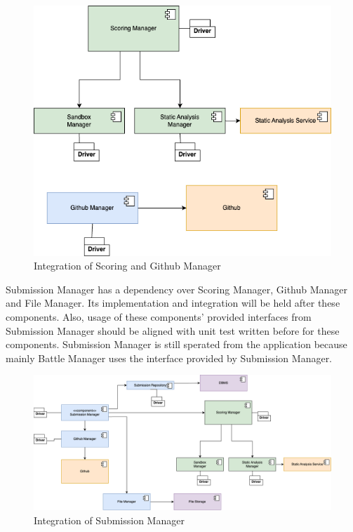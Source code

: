 \begin{figure}[H]
    \centering
    \includegraphics[width=\linewidth]{Images/integration/integration_7.drawio.png}
    \caption{Integration of Scoring and Github Manager}
\end{figure}

\newpage
\indent Submission Manager has a dependency over Scoring Manager, Github Manager and File Manager. Its implementation and integration will be held after these components. Also, usage of these components' provided interfaces from Submission Manager should be aligned with unit test written before for these components. Submission Manager is still sperated from the application because mainly Battle Manager uses the interface provided by Submission Manager.

\begin{figure}[H]
    \centering
    \includegraphics[width=\linewidth]{Images/integration/integration_8.drawio.png}
    \caption{Integration of Submission Manager}
\end{figure}

